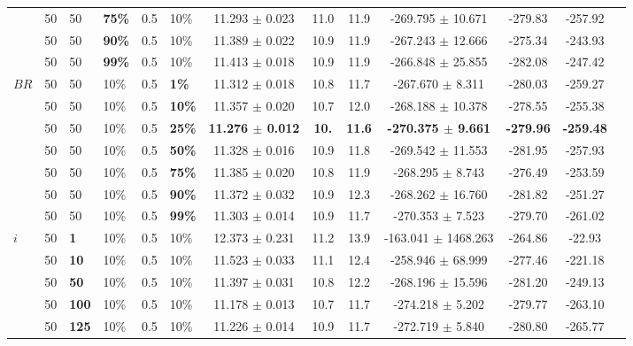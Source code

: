 \begin{sidewaystable}
\begin{tabular}{|l|l|l|l|l|l||c|c|c|c|c|c|c|}
    ~ & 50 & 50 & \textbf{75\%} & 0.5 & 10\% & 11.293 $\pm$ 0.023 & 11.0 & 11.9 & -269.795 $\pm$ 10.671 & -279.83 & -257.92 \\
    ~ & 50 & 50 & \textbf{90\%} & 0.5 & 10\% & 11.389 $\pm$ 0.022 & 10.9 & 11.9 & -267.243 $\pm$ 12.666 & -275.34 & -243.93 \\
    ~ & 50 & 50 & \textbf{99\%} & 0.5 & 10\% & 11.413 $\pm$ 0.018 & 10.9 & 11.9 & -266.848 $\pm$ 25.855 & -282.08 & -247.42  \\
    \hline
    $BR$ & 50 & 50 & 10\% & 0.5 & \textbf{1\%} & 11.312 $\pm$ 0.018 & 10.8 & 11.7 & -267.670 $\pm$ 8.311 & -280.03 & -259.27 \\
    ~    & 50 & 50 & 10\% & 0.5 & \textbf{10\%} & 11.357 $\pm$ 0.020 & 10.7 & 12.0 & -268.188 $\pm$ 10.378 & -278.55 & -255.38 \\
    ~    & 50 & 50 & 10\% & 0.5 & \textbf{25\%} & \textbf{11.276 $\pm$ 0.012} & \textbf{10.} & \textbf{11.6} & \textbf{-270.375 $\pm$ 9.661} & \textbf{-279.96} & \textbf{-259.48} \\
    ~    & 50 & 50 & 10\% & 0.5 & \textbf{50\%} & 11.328 $\pm$ 0.016 & 10.9 & 11.8 & -269.542 $\pm$ 11.553 & -281.95 & -257.93 \\
    ~    & 50 & 50 & 10\% & 0.5 & \textbf{75\%} & 11.385 $\pm$ 0.020 & 10.8 & 11.9 & -268.295 $\pm$ 8.743 & -276.49 & -253.59 \\
    ~    & 50 & 50 & 10\% & 0.5 & \textbf{90\%} & 11.372 $\pm$ 0.032 & 10.9 & 12.3 & -268.262 $\pm$ 16.760 & -281.82 & -251.27 \\
    ~    & 50 & 50 & 10\% & 0.5 & \textbf{99\%} & 11.303 $\pm$ 0.014 & 10.9 & 11.7 & -270.353 $\pm$ 7.523 & -279.70 & -261.02  \\
    \hline
    $i$ & 50 & \textbf{1} & 10\% & 0.5 & 10\% & 12.373 $\pm$ 0.231 & 11.2 & 13.9& -163.041 $\pm$ 1468.263 & -264.86 & -22.93  \\
    ~   & 50 &\textbf{10} & 10\% & 0.5 & 10\% & 11.523 $\pm$ 0.033 & 11.1 & 12.4 & -258.946 $\pm$ 68.999 & -277.46& -221.18 \\
    ~   & 50 &\textbf{50} & 10\% & 0.5 & 10\% & 11.397 $\pm$ 0.031 & 10.8 & 12.2 & -268.196 $\pm$ 15.596 & -281.20 & -249.13 \\
    ~   & 50 &\textbf{100} & 10\% & 0.5 & 10\% & 11.178 $\pm$ 0.013 & 10.7 & 11.7 & -274.218 $\pm$ 5.202 & -279.77 & -263.10 \\
    ~   & 50 &\textbf{125} & 10\% & 0.5 & 10\% & 11.226 $\pm$ 0.014 & 10.9 & 11.7 & -272.719 $\pm$ 5.840 & -280.80 & -265.77  \\

\end{tabular}
\end{sidewaystable}

